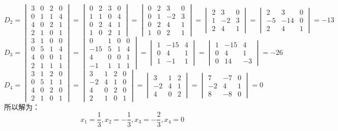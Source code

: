 \begin{solution}
    \[D_2=\begin{vmatrix}3&0&2&0\\0&1&1&4\\4&0&2&1\\2&1&0&1\end{vmatrix}=\begin{vmatrix}0&2&3&0\\1&1&0&4\\0&2&4&1\\1&0&2&1\end{vmatrix}=\begin{vmatrix}0&2&3&0\\0&1&-2&3\\0&2&4&1\\1&0&2&1\end{vmatrix}=\begin{vmatrix}2&3&0\\1&-2&3\\2&4&1\end{vmatrix}=\begin{vmatrix}2&3&0\\-5&-14&0\\2&4&1\end{vmatrix}=-13\]\[
    D_3=\begin{vmatrix}3&1&0&0\\0&5&1&4\\4&0&0&1\\2&1&1&1\end{vmatrix}=\begin{vmatrix}0&1&0&0\\-15&5&1&4\\4&0&0&1\\-1&1&1&1\end{vmatrix}=\begin{vmatrix}1&-15&4\\0&4&1\\1&-1&1\end{vmatrix}=\begin{vmatrix}1&-15&4\\0&4&1\\0&14&-3\end{vmatrix}=-26\]\[
    D_4=\begin{vmatrix}3&1&2&0\\0&5&1&1\\4&0&2&0\\2&1&0&1\end{vmatrix}=\begin{vmatrix}3&1&2&0\\-2&4&1&0\\4&0&2&0\\2&1&0&1\end{vmatrix}=\begin{vmatrix}3&1&2\\-2&4&1\\4&0&2\end{vmatrix}=\begin{vmatrix}7&-7&0\\-2&4&1\\8&-8&0\end{vmatrix}=0    \]
    所以解为：\[x_1=\dfrac{1}{3},x_2=-\dfrac13,x_3=-\dfrac23,x_4=0\]
\end{solution}
